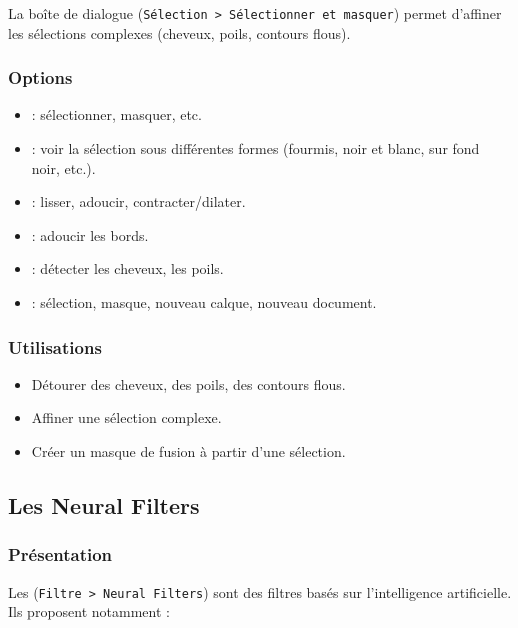 La boîte de dialogue  (\texttt{Sélection > Sélectionner et masquer}) permet d'affiner les sélections complexes (cheveux, poils, contours flous).

\subsubsection{Options}

\begin{itemize}
    \item {} : sélectionner, masquer, etc.
    \item {} : voir la sélection sous différentes formes (fourmis, noir et blanc, sur fond noir, etc.).
    \item {} : lisser, adoucir, contracter/dilater.
    \item {} : adoucir les bords.
    \item {} : détecter les cheveux, les poils.
    \item {} : sélection, masque, nouveau calque, nouveau document.
\end{itemize}

\subsubsection{Utilisations}

\begin{itemize}
    \item Détourer des cheveux, des poils, des contours flous.
    \item Affiner une sélection complexe.
    \item Créer un masque de fusion à partir d'une sélection.
\end{itemize}

\subsection{Les Neural Filters}

\subsubsection{Présentation}

Les  (\texttt{Filtre > Neural Filters}) sont des filtres basés sur l'intelligence artificielle. Ils proposent notamment :

